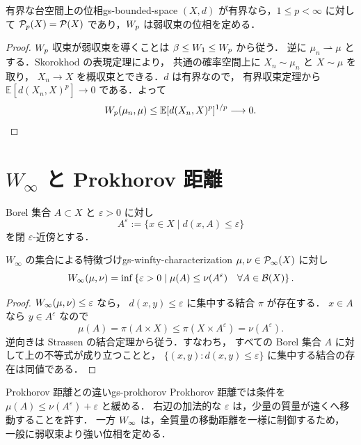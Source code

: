 \begin{proposition}{有界な台空間上の位相}{gs-bounded-space}
  $(X,d)$ が有界なら，$1\leq p<\infty$ に対して
  $\mathcal{P}_{p}(X)=\mathcal{P}(X)$ であり，$W_p$ は弱収束の位相を定める．
\end{proposition}

\begin{proof}
  $W_p$ 収束が弱収束を導くことは
  $\beta\leq W_1\leq W_p$ から従う．
  逆に $\mu_n\rightharpoonup\mu$ とする．Skorokhod の表現定理により，
  共通の確率空間上に $X_n\sim\mu_n$ と $X\sim\mu$ を取り，
  $X_n\to X$ を概収束とできる．$d$ は有界なので，
  有界収束定理から
  $\mathbb{E}[d(X_n,X)^p]\to0$ である．よって
  \[
    W_p(\mu_n,\mu)
    \leq
    \mathbb{E}[d(X_n,X)^p]^{1/p}
    \longrightarrow0.
  \]
\end{proof}

\section{\texorpdfstring{$W_\infty$}{W-infinity} と Prokhorov 距離}
\label{sec:w-infinity}

Borel 集合 $A\subset X$ と $\varepsilon>0$ に対し
\[
  A^\varepsilon
  :=
  \{x\in X\mid d(x,A)\leq\varepsilon\}
\]
を閉 $\varepsilon$-近傍とする．

\begin{proposition}{$W_\infty$ の集合による特徴づけ}{gs-winfty-characterization}
  $\mu,\nu\in\mathcal{P}_{\infty}(X)$ に対し
  \[
    W_\infty(\mu,\nu)
    =
    \inf\left\{
      \varepsilon>0
      \;\middle|\;
      \mu(A)\leq\nu(A^\varepsilon)
      \quad\forall A\in\mathcal{B}(X)
    \right\}.
  \]
\end{proposition}

\begin{proof}
  $W_\infty(\mu,\nu)\leq\varepsilon$ なら，
  $d(x,y)\leq\varepsilon$ に集中する結合 $\pi$ が存在する．
  $x\in A$ なら $y\in A^\varepsilon$ なので
  \[
    \mu(A)=\pi(A\times X)\leq\pi(X\times A^\varepsilon)
    =\nu(A^\varepsilon).
  \]
  逆向きは Strassen の結合定理から従う．すなわち，
  すべての Borel 集合 $A$ に対して上の不等式が成り立つことと，
  $\{(x,y):d(x,y)\leq\varepsilon\}$ に集中する結合の存在は同値である．
\end{proof}

\begin{remark}{Prokhorov 距離との違い}{gs-prokhorov}
  Prokhorov 距離では条件を
  $\mu(A)\leq\nu(A^\varepsilon)+\varepsilon$ と緩める．
  右辺の加法的な $\varepsilon$ は，少量の質量が遠くへ移動することを許す．
  一方 $W_\infty$ は，全質量の移動距離を一様に制御するため，
  一般に弱収束より強い位相を定める．
\end{remark}

